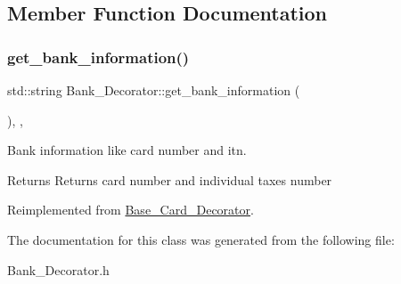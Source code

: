 \subsection{Member Function Documentation}
\mbox{\label{classBank__Decorator_a3fe3f99e85f626f1e0a947c630bf7b00}} 
\subsubsection{\texorpdfstring{get\+\_\+bank\+\_\+information()}{get\_bank\_information()}}
{\footnotesize\ttfamily std\+::string Bank\+\_\+\+Decorator\+::get\+\_\+bank\+\_\+information (\begin{DoxyParamCaption}{ }\end{DoxyParamCaption})\hspace{0.3cm}{\ttfamily [inline]}, {\ttfamily [override]}, {\ttfamily [virtual]}}



Bank information like card number and itn. 

\begin{DoxyReturn}{Returns}
Returns card number and individual taxes number 
\end{DoxyReturn}


Reimplemented from \mbox{\hyperlink{classBase__Card__Decorator}{Base\+\_\+\+Card\+\_\+\+Decorator}}.



The documentation for this class was generated from the following file\+:\begin{DoxyCompactItemize}
\item 
Bank\+\_\+\+Decorator.\+h\end{DoxyCompactItemize}
